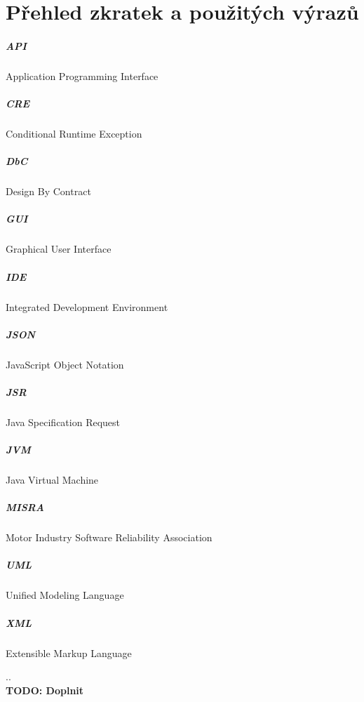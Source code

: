 \chapter*{Přehled zkratek a použitých výrazů}

\paragraph{API}
	Application Programming Interface
	
\paragraph{CRE}
	Conditional Runtime Exception

\paragraph{DbC}
	Design By Contract

\paragraph{GUI}	
	Graphical User Interface

\paragraph{IDE}
	Integrated Development Environment
		
\paragraph{JSON}
	JavaScript Object Notation

\paragraph{JSR}
	Java Specification Request
	
\paragraph{JVM}
	Java Virtual Machine
	
\paragraph{MISRA}
	Motor Industry Software Reliability Association
	
\paragraph{UML}
	Unified Modeling Language
	
\paragraph{XML}
	Extensible Markup Language
	
	
..\\
\textbf{\textcolor{pblue}{TODO: Doplnit}}\\

